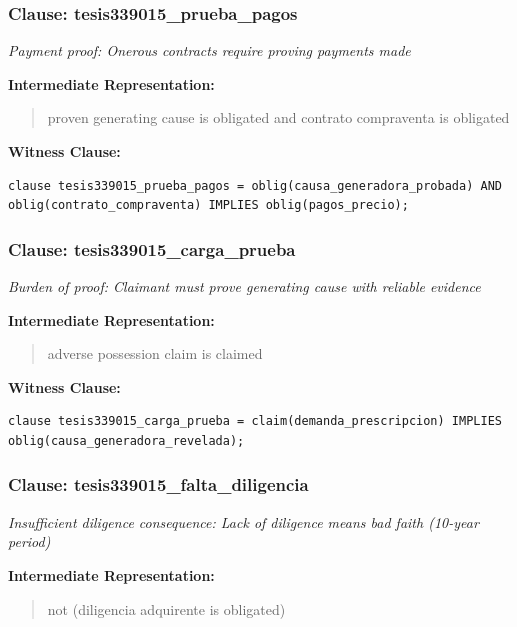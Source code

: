 \documentclass[11pt,a4paper]{article}
\begin{document}
\subsubsection{Clause: tesis339015\_prueba\_pagos}

\textit{Payment proof: Onerous contracts require proving payments made}

\textbf{Intermediate Representation:}

\begin{quote}
proven generating cause is obligated and contrato compraventa is obligated
\end{quote}

\textbf{Witness Clause:}

\begin{lstlisting}[style=witnessstyle, language=Witness]
clause tesis339015_prueba_pagos = oblig(causa_generadora_probada) AND oblig(contrato_compraventa) IMPLIES oblig(pagos_precio);
\end{lstlisting}

\subsubsection{Clause: tesis339015\_carga\_prueba}

\textit{Burden of proof: Claimant must prove generating cause with reliable evidence}

\textbf{Intermediate Representation:}

\begin{quote}
adverse possession claim is claimed
\end{quote}

\textbf{Witness Clause:}

\begin{lstlisting}[style=witnessstyle, language=Witness]
clause tesis339015_carga_prueba = claim(demanda_prescripcion) IMPLIES oblig(causa_generadora_revelada);
\end{lstlisting}

\subsubsection{Clause: tesis339015\_falta\_diligencia}

\textit{Insufficient diligence consequence: Lack of diligence means bad faith (10-year period)}

\textbf{Intermediate Representation:}

\begin{quote}
not (diligencia adquirente is obligated)
\end{quote}
\end{document}
